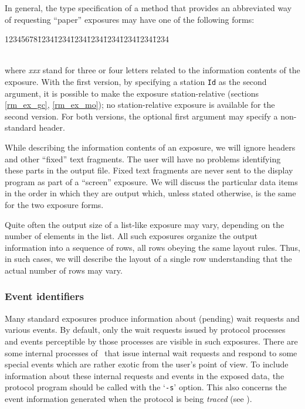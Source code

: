 In general, the type specification of a method that provides an abbreviated
way of requesting ``paper'' exposures may have one of the following forms:
{\tt\begin{tabbing}
12345678\=1234\=1234\=1234\=1234\=1234\=1234\=1234\=1234\kill
{}\\
\\
\end{tabbing}}
where {\em xxx\/} stand for three or four letters related to the information
contents of the exposure.
With the first version, by specifying a station {\tt Id} as
the second argument,
it is possible to make the exposure station-relative
(sections \ref{rm_ex_gc}, \ref{rm_ex_mo}); no station-relative
exposure is available for the second version.
For both versions, the optional first argument may specify a non-standard
header.

While describing the information contents of an exposure, we will ignore
headers and other ``fixed'' text fragments.
The user will have no problems identifying these parts in the output file.
Fixed text fragments are never sent to the display program as part of
a ``screen'' exposure.
We will discuss the particular data items in the order in which they are
output which, unless stated otherwise, is the same for the two exposure
forms.

Quite often the output size of a list-like exposure may vary,
depending on the number of elements in the list.
All such exposures organize the output information into a sequence of
rows, all rows obeying the same layout rules.
Thus, in such cases, we will describe the layout of a single row
understanding that the actual number of rows may vary.

\subsubsection{Event identifiers}
\label{rm_ex_se_ei}

Many standard exposures produce information about (pending)
wait requests and various events.
By default, only the wait requests issued by protocol processes
and events perceptible by those processes are visible in such exposures.
There are some internal processes of \smurph\ that issue internal wait
requests and respond to some special events which are rather exotic
from the user's point of view.
To include information about these internal requests and events in
the exposed data, the protocol program should be called with the `{\tt -s}'
option.
This also concerns the event information generated when the protocol
is being {\em traced\/} (see ).

